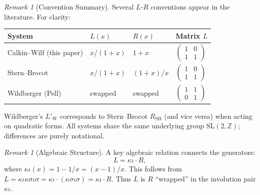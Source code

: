 \documentclass[11pt]{article}
\theoremstyle{plain}
\theoremstyle{definition}
\theoremstyle{remark}
\newtheorem{remark}[theorem]{Remark}
\begin{document}
\begin{remark}[Convention Summary]
Several $L$-$R$ conventions appear in the literature. For clarity:
\begin{center}
\begin{tabular}{llll}
\toprule
System & $L(x)$ & $R(x)$ & Matrix $L$ \\
\midrule
Calkin--Wilf (this paper) & $x/(1+x)$ & $1+x$ & $\begin{pmatrix} 1 & 0 \\ 1 & 1 \end{pmatrix}$ \\[2mm]
Stern--Brocot & $x/(1+x)$ & $(1+x)/x$ & $\begin{pmatrix} 1 & 0 \\ 1 & 1 \end{pmatrix}$ \\[2mm]
Wildberger (Pell) & swapped & swapped & $\begin{pmatrix} 1 & 1 \\ 0 & 1 \end{pmatrix}$ \\
\bottomrule
\end{tabular}
\end{center}
Wildberger's $L'_{\mathrm{W}}$ corresponds to Stern--Brocot $R_{\mathrm{SB}}$
(and vice versa) when acting on quadratic forms.
All systems share the same underlying group $\mathrm{SL}(2,\mathbb{Z})$;
differences are purely notational.
\end{remark}

\begin{remark}[Algebraic Structure]
A key algebraic relation connects the generators:
\begin{equation}\label{eq:LR-relation}
L = \kappa\iota \cdot R,
\end{equation}
where $\kappa\iota(x) = 1 - 1/x = (x-1)/x$. This follows from
$L = \kappa\iota\kappa\sigma\iota\sigma = \kappa\iota \cdot (\kappa\sigma\iota\sigma) = \kappa\iota \cdot R$.
Thus $L$ is $R$ ``wrapped'' in the involution pair $\kappa\iota$.
\end{remark}
\end{document}
